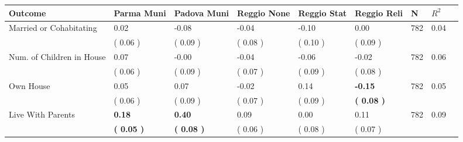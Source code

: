 \begin{tabular}{L{6.2cm} C{1.8cm} C{1.8cm} C{1.8cm} C{1.8cm} C{1.8cm} C{1.8cm} C{0.3cm} C{0.3cm}}
\toprule
 \textbf{Outcome} & \textbf{Parma Muni} & \textbf{Padova Muni} & \textbf{Reggio None} & \textbf{Reggio Stat} & \textbf{Reggio Reli} & \textbf{N} & \textbf{$ R^2$} \\
\midrule
Married or Cohabitating &      0.02 &     -0.08 &     -0.04 &     -0.10 &      0.00  & 782 &       0.04 \\ 
 & (     0.06 ) & (     0.09 ) & (     0.08 ) & (     0.10 ) & (     0.09 )  & \\
Num. of Children in House &      0.07 &     -0.00 &     -0.04 &     -0.06 &     -0.02  & 782 &       0.06 \\ 
 & (     0.06 ) & (     0.09 ) & (     0.07 ) & (     0.09 ) & (     0.08 )  & \\
Own House &      0.05 &      0.07 &     -0.02 &      0.14 & \textbf{    -0.15}  & 782 &       0.05 \\ 
 & (     0.06 ) & (     0.09 ) & (     0.07 ) & (     0.09 ) & \textbf{(     0.08 )}  & \\
Live With Parents & \textbf{     0.18} & \textbf{     0.40} &      0.09 &      0.00 &      0.11  & 782 &       0.09 \\ 
 & \textbf{(     0.05 )} & \textbf{(     0.08 )} & (     0.06 ) & (     0.08 ) & (     0.07 )  & \\
\bottomrule
\end{tabular}
